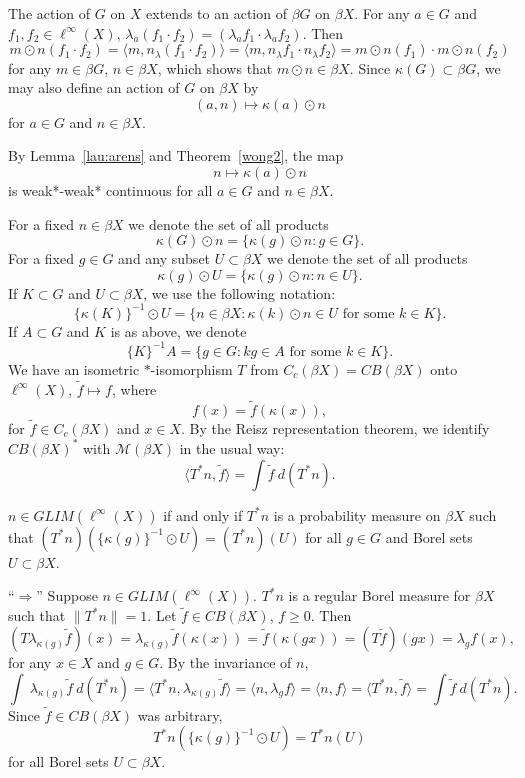 The action of $G$ on $X$ extends to an action of $\beta G$ on $\beta X$.
For any $a\in G$ and $f_1,f_2 \in \ell^\infty (X)$, $\lambda_a (f_1\cdot f_2) = (\lambda_a f_1 \cdot  \lambda_a f_2)$.
Then
\[
m\odot n(f_1\cdot f_2) = \langle m, n_\lambda (f_1\cdot f_2) \rangle = \langle m, n_\lambda f_1 \cdot n_\lambda f_2 \rangle
= m\odot n(f_1) \cdot m\odot n(f_2)
\]
for any $m\in \beta G$, $n\in \beta X$, which shows that $m\odot n \in \beta X$.
Since $\kappa(G)\subset \beta G$, we may also define an action of $G$ on $\beta X$ by 
\[
(a,n) \mapsto \kappa(a) \odot n
\]
for $a\in G$ and $n\in \beta X$.

\begin{remark}\label{w*-w*}
By Lemma~\ref{lau:arens} and Theorem~\ref{wong2}, the map
\[
n \mapsto \kappa(a) \odot n
\]
is weak*-weak* continuous for all $a\in G$ and $n\in \beta X$.
\end{remark}

For a fixed $n\in \beta X$ we denote the set of all products
\[
\kappa(G) \odot n = \{\kappa(g) \odot n : g\in G\}.
\]
For a fixed $g\in G$ and any subset $U\subset \beta X$  we denote the set
of all products
\[
\kappa(g) \odot U = \{\kappa(g) \odot n: n\in U\}.
\]
If $K\subset G$ and $U\subset \beta X$, we use the following notation:
\[
\{\kappa(K)\}^{-1} \odot U = \{ n\in \beta X : \kappa(k) \odot n \in U\text{ for some }k\in K\}.
\]
If $A\subset G$ and $K$ is as above, we denote
\[
\{K\}^{-1}A = \{g\in G: kg\in A\text{ for some }k\in K\}.
\]
We have an isometric $*$-isomorphism $T$ from $C_c (\beta X) = CB(\beta X)$ onto $\ell^\infty (X)$,
$\tilde{f}\mapsto f$, where
\[
f(x) = \tilde{f}(\kappa(x)),
\]
for $\tilde{f}\in C_c (\beta X)$ and $x\in X$.  By the Reisz representation theorem, we identify
$CB(\beta X)^*$ with $\mathcal{M}(\beta X)$ in the usual way:
\[
\langle T^*n, \tilde{f}\rangle = \int\tilde{f}\:d(T^*n).
\]

\begin{proposition}\label{probmeas}
$n\in GLIM(\ell^\infty(X))$ if and only if
$T^* n$ is a probability measure on $\beta X$ such that
$(T^*n)(\{\kappa(g)\}^{-1} \odot U) = (T^*n)(U)$ for all $g\in G$ and Borel sets $U\subset \beta X$.
\end{proposition}
\proof
``$\Rightarrow$''
Suppose $n\in GLIM(\ell^\infty(X))$.  $T^*n$ is a regular Borel measure for $\beta X$ such that
$\|T^*n\| = 1$.  Let $\tilde{f}\in CB(\beta X)$, $f\geq 0$.  Then
\[
(T \lambda_{\kappa(g)}\tilde{f})(x) = \lambda_{\kappa(g)}\tilde{f}(\kappa(x)) = \tilde{f}(\kappa(gx)) =
(T\tilde{f})(gx) = \lambda_g f(x),
\]
for any $x\in X$ and $g\in G$.
By the invariance of $n$,
\[
\int\:\lambda_{\kappa(g)} \tilde{f}\:d(T^*n) = \langle T^*n, \lambda_{\kappa(g)} \tilde{f}\rangle =
\langle n,\lambda_g f\rangle = \langle n, f\rangle = \langle T^*n, \tilde{f}\rangle = \int \tilde{f}\:d(T^*n).
\]
Since $\tilde{f}\in CB (\beta X)$ was arbitrary,
\[
T^*n(\{\kappa(g)\}^{-1} \odot U) = T^*n(U)
\]
for all Borel sets $U\subset \beta X$.

